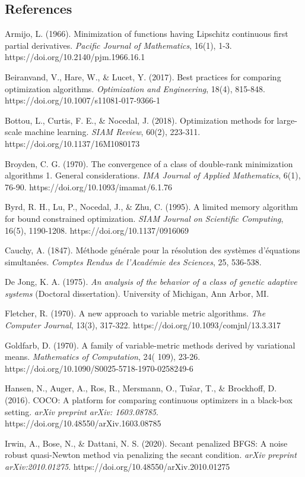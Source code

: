 \hypertarget{references}{%
\subsection{References}\label{references}}

Armijo, L. (1966). Minimization of functions having Lipschitz continuous first partial derivatives. \emph{Pacific Journal of
Mathematics}, 16(1), 1-3. https://doi.org/10.2140/pjm.1966.16.1

Beiranvand, V., Hare, W., \& Lucet, Y. (2017). Best practices for comparing optimization algorithms. \emph{Optimization and
Engineering}, 18(4), 815-848. https://doi.org/10.1007/s11081-017-9366-1

Bottou, L., Curtis, F. E., \& Nocedal, J. (2018). Optimization methods for large-scale machine learning. \emph{SIAM Review},
60(2), 223-311. https://doi.org/10.1137/16M1080173

Broyden, C. G. (1970). The convergence of a class of double-rank minimization algorithms 1. General considerations. \emph{IMA
Journal of Applied Mathematics}, 6(1), 76-90. https://doi.org/10.1093/imamat/6.1.76

Byrd, R. H., Lu, P., Nocedal, J., \& Zhu, C. (1995). A limited memory algorithm for bound constrained optimization. \emph{SIAM
Journal on Scientific Computing}, 16(5), 1190-1208. https://doi.org/10.1137/0916069

Cauchy, A. (1847). Méthode générale pour la résolution des systèmes d'équations simultanées. \emph{Comptes Rendus de
l'Académie des Sciences}, 25, 536-538.

De Jong, K. A. (1975). \emph{An analysis of the behavior of a class of genetic adaptive systems} (Doctoral dissertation).
University of Michigan, Ann Arbor, MI.

Fletcher, R. (1970). A new approach to variable metric algorithms. \emph{The Computer Journal}, 13(3),
317-322. https://doi.org/10.1093/comjnl/13.3.317

Goldfarb, D. (1970). A family of variable-metric methods derived by variational means. \emph{Mathematics of Computation}, 24(
109), 23-26. https://doi.org/10.1090/S0025-5718-1970-0258249-6

Hansen, N., Auger, A., Ros, R., Mersmann, O., Tušar, T., \& Brockhoff, D. (2016). COCO: A platform for comparing
continuous optimizers in a black-box setting. \emph{arXiv preprint arXiv:
1603.08785}. https://doi.org/10.48550/arXiv.1603.08785

Irwin, A., Bose, N., \& Dattani, N. S. (2020). Secant penalized BFGS: A noise robust quasi-Newton method via penalizing
the secant condition. \emph{arXiv preprint arXiv:2010.01275}. https://doi.org/10.48550/arXiv.2010.01275

